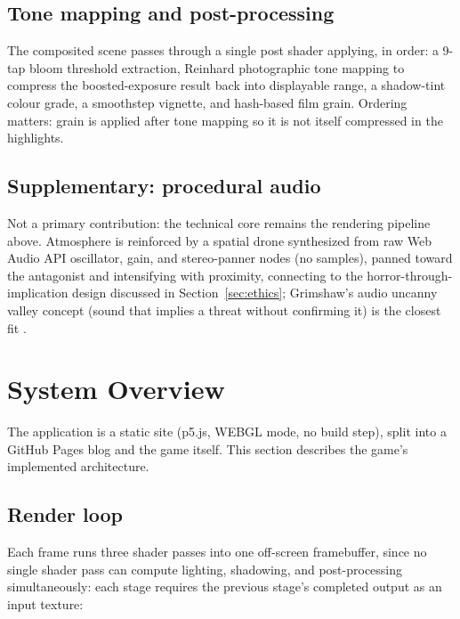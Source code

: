 \documentclass[conference]{IEEEtran}
\begin{document}
\subsection{Tone mapping and post-processing}
The composited scene passes through a single post shader applying, in order: a 9-tap bloom threshold extraction, Reinhard photographic tone mapping \cite{reinhard2002tonereproduction} to compress the boosted-exposure result back into displayable range, a shadow-tint colour grade, a smoothstep vignette, and hash-based film grain. Ordering matters: grain is applied after tone mapping so it is not itself compressed in the highlights.

\subsection{Supplementary: procedural audio}
Not a primary contribution: the technical core remains the rendering pipeline above. Atmosphere is reinforced by a spatial drone synthesized from raw Web Audio API oscillator, gain, and stereo-panner nodes (no samples), panned toward the antagonist and intensifying with proximity, connecting to the horror-through-implication design discussed in Section~\ref{sec:ethics}; Grimshaw's audio uncanny valley concept (sound that implies a threat without confirming it) is the closest fit \cite{grimshaw2009audiouncanny}.

\section{System Overview}
The application is a static site (p5.js, WEBGL mode, no build step), split into a GitHub Pages blog and the game itself. This section describes the game's implemented architecture.

\subsection{Render loop}
Each frame runs three shader passes into one off-screen framebuffer, since no single shader pass can compute lighting, shadowing, and post-processing simultaneously: each stage requires the previous stage's completed output as an input texture:
\end{document}
